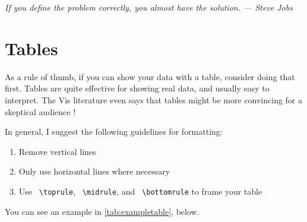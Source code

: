 

\newpage
\vspace{2em}
\begin{center}
    \emph{If you define the problem correctly, you almost have the solution. --- Steve Jobs}
\end{center}

\section{Tables}
As a rule of thumb, if you can show your data with a table, consider doing that first. Tables are quite effective for showing real data, and usually easy to interpret. The Vis literature even says that tables might be more convincing for a skeptical audience \citep{pandey2014persuasive}!

In general, I suggest the following guidelines for formatting: 
\begin{enumerate}
    \item Remove vertical lines
    \item Only use horizontal lines where necessary
    \item Use \texttt{ \textbackslash toprule}, \texttt{ \textbackslash midrule}, and \texttt{ \textbackslash bottomrule} to frame your table
\end{enumerate}

You can see an example in \autoref{tab:exampletable}, below.

